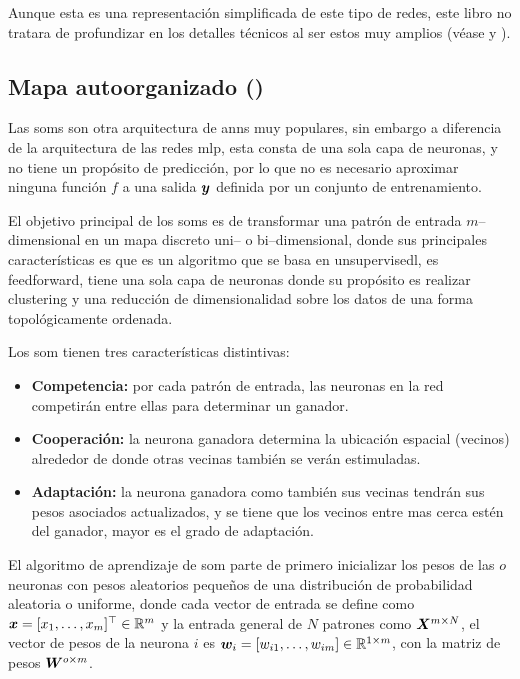 Aunque esta es una representación simplificada de este tipo de redes, este libro no tratara de profundizar en los detalles técnicos al ser estos muy amplios (véase \cite{deeplearning} y \cite{bishop-pattern-recognition}).

\subsection{Mapa autoorganizado ()} \label{subsec:SOM}
Las \glspl{som} son otra arquitectura de \glspl{ann} muy populares, sin embargo a diferencia de la arquitectura de las redes \gls{mlp}, esta consta de una sola capa de neuronas, y no tiene un propósito de predicción, por lo que no es necesario aproximar ninguna función $f$ a una salida ${\bm{y}}$ definida por un conjunto de entrenamiento.

El objetivo principal de los \glspl{som} es de transformar una patrón de entrada $m$--dimensional en un mapa discreto uni-- o bi--dimensional, donde sus principales características es que es un algoritmo que se basa en \gls{unsupervisedl}, es \gls{feedforward}, tiene una sola capa de neuronas donde su propósito es realizar \gls{clustering} y una reducción de dimensionalidad sobre los datos de una forma topológicamente ordenada.

Los \gls{som} tienen tres características distintivas:
\begin{itemize}
\item {\bf Competencia:} por cada patrón de entrada, las neuronas en la red competirán entre ellas para determinar un ganador.
\item {\bf Cooperación:} la neurona ganadora determina la ubicación espacial (vecinos) alrededor de donde otras vecinas también se verán estimuladas.
\item {\bf Adaptación:} la neurona ganadora como también sus vecinas tendrán sus pesos asociados actualizados, y se tiene que los vecinos entre mas cerca estén del ganador, mayor es el grado de adaptación.
\end{itemize}

El algoritmo de aprendizaje de \gls{som} parte de primero inicializar los pesos de las $o$ neuronas con pesos aleatorios pequeños de una distribución de probabilidad aleatoria o uniforme, donde cada vector de entrada se define como ${\bm{x}} = [x_1, \ldots, x_m]^{\top} \in \mathbb{R}^{m}$ y la entrada general de $N$ patrones como ${\bm{X}}^{m \times N}$, el vector de pesos de la neurona $i$ es ${\bm{w}}_i = [w_{i1}, \ldots, w_{im}] \in \mathbb{R}^{1 \times m}$, con la matriz de pesos ${\bm{W}}^{o \times m}$.

